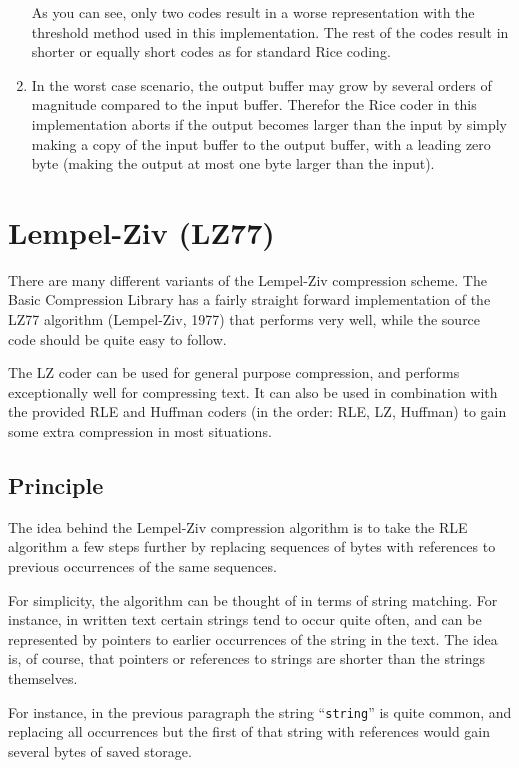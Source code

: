 \documentclass[a4paper,11pt,oneside]{report}
\begin{document}
\begin{enumerate}
      As you can see, only two codes result in a worse representation with the
      threshold method used in this implementation. The rest of the codes
      result in shorter or equally short codes as for standard Rice coding.

\item In the worst case scenario, the output buffer may grow by several
      orders of magnitude compared to the input buffer. Therefor the Rice
      coder in this implementation aborts if the output becomes larger than
      the input by simply making a copy of the input buffer to the output
      buffer, with a leading zero byte (making the output at most one byte
      larger than the input).
\end{enumerate}



\section{Lempel-Ziv (LZ77)}
There are many different variants of the Lempel-Ziv compression scheme.
The Basic Compression Library has a fairly straight forward implementation
of the LZ77 algorithm (Lempel-Ziv, 1977) that performs very well, while
the source code should be quite easy to follow.

The LZ coder can be used for general purpose compression, and performs
exceptionally well for compressing text. It can also be used in
combination with the provided RLE and Huffman coders (in the order:
RLE, LZ, Huffman) to gain some extra compression in most situations.


\subsection{Principle}
The idea behind the Lempel-Ziv compression algorithm is to take the
RLE algorithm a few steps further by replacing sequences of bytes
with references to previous occurrences of the same sequences.

For simplicity, the algorithm can be thought of in terms of string
matching. For instance, in written text certain strings tend to
occur quite often, and can be represented by pointers to earlier
occurrences of the string in the text. The idea is, of course, that
pointers or references to strings are shorter than the strings
themselves.

For instance, in the previous paragraph the string ``\texttt{string}''
is quite common, and replacing all occurrences but the first of that
string with references would gain several bytes of saved storage.
\end{document}
